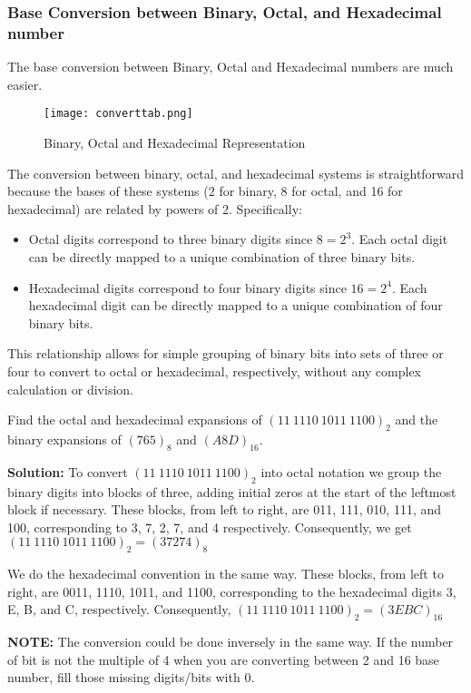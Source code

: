 \subsubsection*{Base Conversion between Binary, Octal, and Hexadecimal number}
The base conversion between Binary, Octal and Hexadecimal numbers are much easier.
\begin{figure}[H]
	\centering
	\texttt{[image: converttab.png]}
    \caption{Binary, Octal and Hexadecimal Representation}
\end{figure}
The conversion between binary, octal, and hexadecimal systems is straightforward because the bases of these systems (2 for binary, 8 for octal, and 16 for hexadecimal) are related by powers of 2. Specifically:
\begin{itemize}
    \item Octal digits correspond to three binary digits since \(8 = 2^3\). Each octal digit can be directly mapped to a unique combination of three binary bits.
    \item Hexadecimal digits correspond to four binary digits since \(16 = 2^4\). Each hexadecimal digit can be directly mapped to a unique combination of four binary bits.
\end{itemize}
This relationship allows for simple grouping of binary bits into sets of three or four to convert 
to octal or hexadecimal, respectively, without any complex calculation or division. 
\begin{example}
	Find the octal and hexadecimal expansions of $(11\ 1110\ 1011\  1100)_2$ and the binary expansions of $(765)_{8}$ and $(A8D)_{16}$.
\end{example}
\textbf{Solution:} To convert $(11\ 1110\ 1011\  1100)_2$ into octal notation we group the binary digits
into blocks of three, adding initial zeros at the start of the leftmost block if necessary.
These blocks, from left to right, are 011, 111, 010, 111, and 100, corresponding to 3, 7, 2, 7, and 4 respectively. Consequently, we get $(11\ 1110\ 1011\  1100)_2 = (37274)_8$
\par We do the hexadecimal convention in the same way. These blocks, from left to right, are 0011,
1110, 1011, and 1100, corresponding to the hexadecimal digits 3, E, B, and C, respectively. Consequently, $(11\ 1110\ 1011\  1100)_2 = (3EBC)_{16}$
\par \textbf{NOTE: } The conversion could be done inversely in the same way. If the number of bit is not the multiple of 4 when you are converting between 2 and 16 base
number, fill those missing digits/bits with 0.


